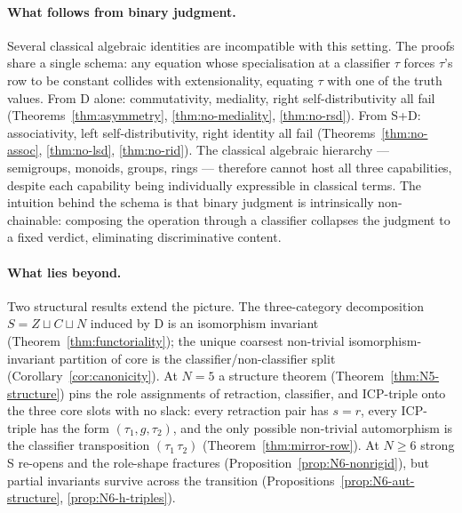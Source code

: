 \paragraph{What follows from binary judgment.} Several classical
algebraic identities are incompatible with this setting. The proofs
share a single schema: any equation whose specialisation at a
classifier $\tau$ forces $\tau$'s row to be constant collides with
extensionality, equating $\tau$ with one of the truth values. From D
alone: commutativity, mediality, right self-distributivity all fail
(Theorems~\ref{thm:asymmetry}, \ref{thm:no-mediality}, \ref{thm:no-rsd}).
From S+D: associativity, left self-distributivity, right identity all
fail (Theorems~\ref{thm:no-assoc}, \ref{thm:no-lsd}, \ref{thm:no-rid}).
The classical algebraic hierarchy --- semigroups, monoids, groups, rings
--- therefore cannot host all three capabilities, despite each capability
being individually expressible in classical terms. The intuition behind
the schema is that binary judgment is intrinsically non-chainable:
composing the operation through a classifier collapses the judgment to
a fixed verdict, eliminating discriminative content.

\paragraph{What lies beyond.} Two structural results extend the picture.
The three-category decomposition $S = Z \sqcup C \sqcup N$ induced by D
is an isomorphism invariant (Theorem~\ref{thm:functoriality}); the
unique coarsest non-trivial isomorphism-invariant partition of core is
the classifier/non-classifier split (Corollary~\ref{cor:canonicity}).
At $N = 5$ a structure theorem (Theorem~\ref{thm:N5-structure}) pins the
role assignments of retraction, classifier, and ICP-triple onto the
three core slots with no slack: every retraction pair has $s = r$, every
ICP-triple has the form $(\tau_1, g, \tau_2)$, and the only possible
non-trivial automorphism is the classifier transposition
$(\tau_1\,\tau_2)$ (Theorem~\ref{thm:mirror-row}). At $N \geq 6$ strong S
re-opens and the role-shape fractures (Proposition~\ref{prop:N6-nonrigid}),
but partial invariants survive across the transition
(Propositions~\ref{prop:N6-aut-structure}, \ref{prop:N6-h-triples}).

